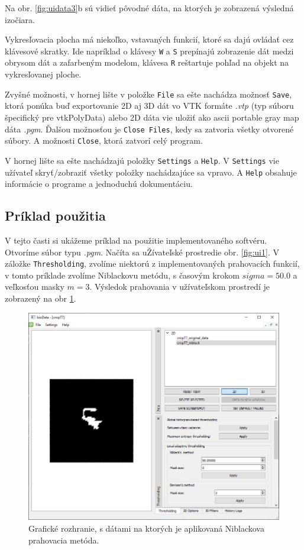\documentclass[a4paper,11pt,oneside]{article}%
\begin{document}
Na obr. \ref{fig:uidata3}b sú vidieť pôvodné dáta, na ktorých je zobrazená výsledná izočiara.

Vykresľovacia plocha má niekoľko, vstavaných funkcií, ktoré sa dajú ovládať cez klávesové skratky. Ide napríklad o klávesy \texttt{W} a \texttt{S} prepínajú zobrazenie dát medzi obrysom dát a zafarbeným modelom, klávesa \texttt{R} reštartuje pohľad na objekt na vykresľovanej ploche.
 
Zvyšné možnosti, v hornej lište v položke \texttt{File} sa ešte nachádza možnosť \texttt{Save}, ktorá ponúka buď exportovanie 2D aj 3D dát vo VTK formáte \textit{.vtp} (typ súboru špecifický pre vtkPolyData) alebo 2D dáta vie uložiť ako ascii portable gray map dáta \textit{.pgm}. Ďalšou možnosťou je \texttt{Close Files}, kedy sa zatvoria všetky otvorené súbory. A možnosti \texttt{Close}, ktorá zatvorí celý program.

V hornej lište sa ešte nachádzajú položky \texttt{Settings} a \texttt{Help}. V \texttt{Settings} vie užívateľ skryť/zobraziť všetky položky nachádzajúce sa vpravo. A \texttt{Help} obsahuje informácie o programe a jednoduchú dokumentáciu.

\subsection{Príklad použitia}

V tejto časti si ukážeme príklad na použitie implementovaného softvéru. Otvoríme súbor typu \textit{.pgm}. Načíta sa uŽívateľské prostredie obr. \ref{fig:ui1}. V záložke \texttt{Thresholding}, zvolíme niektorú z implementovaných prahovacích funkcií, v tomto príklade zvolíme Niblackovu metódu, s časovým krokom $sigma = 50.0$ a veľkosťou masky $m = 3$. Výsledok prahovania v užívateľskom prostredí je zobrazený na obr \ref{fig:nbui}.

 
\begin{figure}[H]
 \begin{center} 
 \includegraphics[scale=0.50]{pics/uinb.jpg}
\caption{Grafické rozhranie, s dátami na ktorých je aplikovaná Niblackova prahovacia metóda.}
\label{fig:nbui}
\end{center} 
\end{figure}
\end{document}
